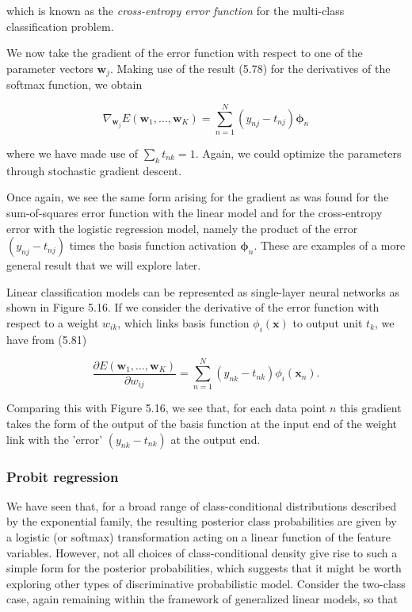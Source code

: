 \documentclass{article}
\begin{document}
which is known as the \textit{cross-entropy error function} for the multi-class classification problem.

We now take the gradient of the error function with respect to one of the parameter vectors $\mathbf{w}_{j}$. Making use of the result (5.78) for the derivatives of the softmax function, we obtain

\begin{equation}
\nabla_{\mathbf{w}_{j}}E(\mathbf{w}_{1},\ldots,\mathbf{w}_{K})=\sum_{n=1}^{N}(y_{nj}-t_{nj})\boldsymbol{\phi}_{n}
\tag{5.81}
\end{equation}

where we have made use of $\sum_{k}t_{nk}=1$. Again, we could optimize the parameters through stochastic gradient descent.

Once again, we see the same form arising for the gradient as was found for the sum-of-squares error function with the linear model and for the cross-entropy error with the logistic regression model, namely the product of the error $(y_{nj}-t_{nj})$ times the basis function activation $\boldsymbol{\phi}_{n}$. These are examples of a more general result that we will explore later.

Linear classification models can be represented as single-layer neural networks as shown in Figure 5.16. If we consider the derivative of the error function with respect to a weight $w_{ik}$, which links basis function $\phi_{i}(\mathbf{x})$ to output unit $t_{k}$, we have from (5.81)

\begin{equation}
\frac{\partial E(\mathbf{w}_{1},\ldots,\mathbf{w}_{K})}{\partial w_{ij}}=\sum_{n=1}^{N}(y_{nk}-t_{nk})\phi_{i}(\mathbf{x}_{n}).
\tag{5.82}
\end{equation}

Comparing this with Figure 5.16, we see that, for each data point $n$ this gradient takes the form of the output of the basis function at the input end of the weight link with the 'error' $(y_{nk}-t_{nk})$ at the output end.

\subsubsection{Probit regression}

We have seen that, for a broad range of class-conditional distributions described by the exponential family, the resulting posterior class probabilities are given by a logistic (or softmax) transformation acting on a linear function of the feature variables. However, not all choices of class-conditional density give rise to such a simple form for the posterior probabilities, which suggests that it might be worth exploring other types of discriminative probabilistic model. Consider the two-class case, again remaining within the framework of generalized linear models, so that
\end{document}
